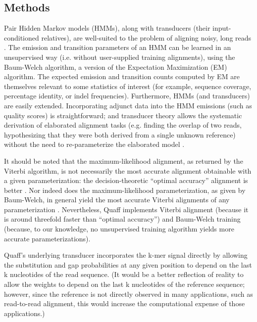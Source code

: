 \documentclass{bioinfo}
\begin{document}
\begin{methods}
\section{Methods}

Pair Hidden Markov models (HMMs), along with transducers (their input-conditioned relatives), are well-suited to the problem of aligning noisy, long reads \citep{Durbin1998-ps}. The emission and transition parameters of an HMM can be learned in an unsupervised way (i.e. without user-supplied training alignments), using the Baum-Welch algorithm, a version of the Expectation Maximization (EM) algorithm. The expected emission and transition counts computed by EM are themselves relevant to some statistics of interest (for example, sequence coverage, percentage identity, or indel frequencies). Furthermore, HMMs (and transducers) are easily extended. Incorporating adjunct data into the HMM emissions (such as quality scores) is straightforward; and transducer theory allows the systematic derivation of elaborated alignment tasks (e.g. finding the overlap of two reads, hypothesizing that they were both derived from a single unknown reference) without the need to re-parameterize the elaborated model \citep{Westesson2012-zg}.

It should be noted that the maximum-likelihood alignment, as returned by the Viterbi algorithm, is not necessarily the most accurate alignment obtainable with a given parameterization: the decision-theoretic ``optimal accuracy'' alignment is better \citep{Holmes1998-pr}. Nor indeed does the maximum-likelihood parameterization, as given by Baum-Welch, in general yield the most accurate Viterbi alignments of any parameterization \citep{Drasdo1998-hl,Frith2010-zj}. Nevertheless, Quaff implements Viterbi alignment (because it is around threefold faster than ``optimal accuracy'') and Baum-Welch training (because, to our knowledge, no unsupervised training algorithm yields more accurate parameterizations).

Quaff's underlying transducer incorporates the k-mer signal directly by allowing the substitution and gap probabilities at any given position to depend on the last k nucleotides of the read sequence. (It would be a better reflection of reality to allow the weights to depend on the last k nucleotides of the reference sequence; however, since the reference is not directly observed in many applications, such as read-to-read alignment, this would increase the computational expense of those applications.)


\end{methods}
\end{document}
